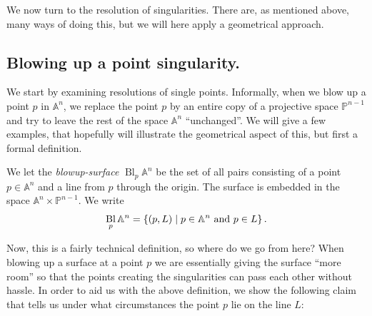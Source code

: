\documentclass{article}
\newcommand{\A}{\ensuremath{\mathbb{A}}}
\renewcommand{\P}{\ensuremath{\mathbb{P}}}
\DeclareMathOperator{\Bl}{Bl}
\begin{document}
    We now turn to the resolution of singularities. There are, as mentioned
    above, many ways of doing this, but we will here apply a geometrical
    approach.

    \subsection{Blowing up a point singularity.}
    \label{sub:blowing_up_a_point_singularity_}
    
    We start by examining resolutions of single points. Informally, when we
    blow up a point $p$ in $\A^n$, we replace the point $p$ by an entire copy
    of a projective space $\P^{n-1}$ and try to leave the rest of the space
    $\A^n$ ``unchanged''. We will give a few examples, that hopefully will
    illustrate the geometrical aspect of this, but first a formal definition.

    \begin{definition}[Blowup of $\A^{n}$ at a point $p$.]
        We let the \emph{blowup-surface}
        $\Bl_p\A^{n}$ be the set of all pairs consisting of a point $p \in
        \A^n$ and a line from $p$ through the origin. The surface is embedded
        in the space $\A^n\times\P^{n-1}$. We write
        \begin{equation}
            \notag
            \Bl_p\A^n = \left\{ (p, L) \mid p \in \A^{n} \text{ and } p \in L \right\}.
        \end{equation}
    \end{definition}
    Now, this is a fairly technical definition, so where do we go from here?
    When blowing up a surface at a point $p$ we are essentially giving the
    surface ``more room'' so that the points creating the singularities can
    pass each other without hassle. In order to aid us with the above
    definition, we show the following claim that tells us under what
    circumstances the point $p$ lie on the line $L$:
\end{document}
